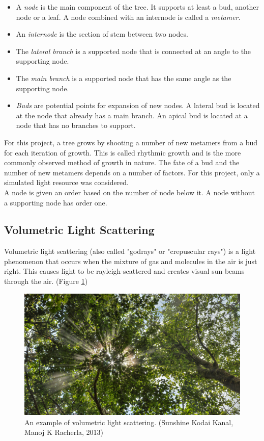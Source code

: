 \documentclass{article}
\begin{document}
  			\begin{itemize}
  				\item A \textit{node} is the main component of the tree. It supports at least a bud, another node or a leaf. A node combined with an internode is called a \textit{metamer}. \citep{barthelemy2007plant}
  				\item An \textit{internode} is the section of stem between two nodes.
  				\item The \textit{lateral branch} is a supported node that is connected at an angle  to the supporting node.
  				\item The \textit{main branch} is a supported node that has the same angle as the supporting node.
  				\item \textit{Buds} are potential points for expansion of new nodes. A lateral bud is located at the node that already has a main branch. An apical bud is located at a node that has no branches to support.
  				
  			\end{itemize}
  			
  			For this project, a tree grows by shooting a number of new metamers from a bud for each iteration of growth. This is called rhythmic growth and is the more commonly observed method of growth in nature. \citep{barthelemy2007plant} The fate of a bud and the number of new metamers depends on a number of factors. For this project, only a simulated light resource was considered.\\
  			
  			A node is given an order based on the number of node below it. A node without a supporting node has order one.
  		\subsection{Volumetric Light Scattering}
  			Volumetric light scattering (also called "godrays" or "crepuscular rays") is a light phenomenon that occurs when the mixture of gas and molecules in the air is just right. This causes light to be rayleigh-scattered and creates visual sun beams through the air. (Figure \ref{fig:godrayexample})
  			
  			\begin{figure}[h!]
  				\centering
  				\includegraphics[scale=0.7]{godrays_example}
  				\caption{An example of volumetric light scattering. (Sunshine Kodai Kanal, Manoj K Racherla, 2013)}
  				\label{fig:godrayexample}
  			\end{figure}
  			
\end{document}
